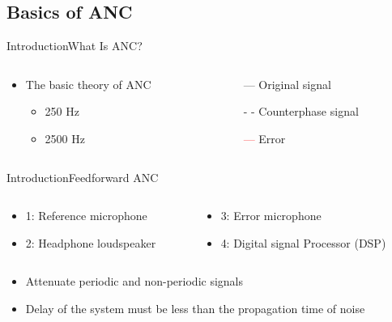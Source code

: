 \subsection{Basics of ANC}
\begin{frame}{Introduction}{What Is ANC?}
	\begin{columns}
		\begin{column}{0.5\textwidth}
				\begin{itemize}
					\item The basic theory of ANC
					\begin{itemize}
						\item  250 Hz
						\item 2500 Hz 
					\end{itemize}	
				\end{itemize}
			\vspace{-2.5mm}	
		\begin{center}
	 		
	 	\end{center}
		\end{column}
		\begin{column}{0.5\textwidth} 
			\begin{itemize}
				\item[\textcolor{MATLABblue}{---}] Original signal
				\item[\textcolor{MATLABblue}{- -}] Counterphase signal
				\item[\textcolor{red}{---}] Error
			\end{itemize}
		\begin{center}
	 		
	 	\end{center}
		\end{column}
	\end{columns}
\end{frame}

\begin{frame}{Introduction}{Feedforward ANC}
	\begin{columns}	
			\begin{column}{0.5\textwidth}
			\begin{itemize}
			\item 1: Reference microphone
			\item 2: Headphone loudspeaker
			\end{itemize}
			\end{column}		
	\begin{column}{0.5\textwidth} 
	\begin{itemize}
			\item 3: Error microphone
			\item 4: Digital signal Processor (DSP)
	\end{itemize}
	\end{column}	
	\end{columns}	
	
	\begin{itemize}
			\item Attenuate periodic and non-periodic signals
			\item Delay of the system must be less than the propagation time of noise
	\end{itemize}		
\end{frame}

